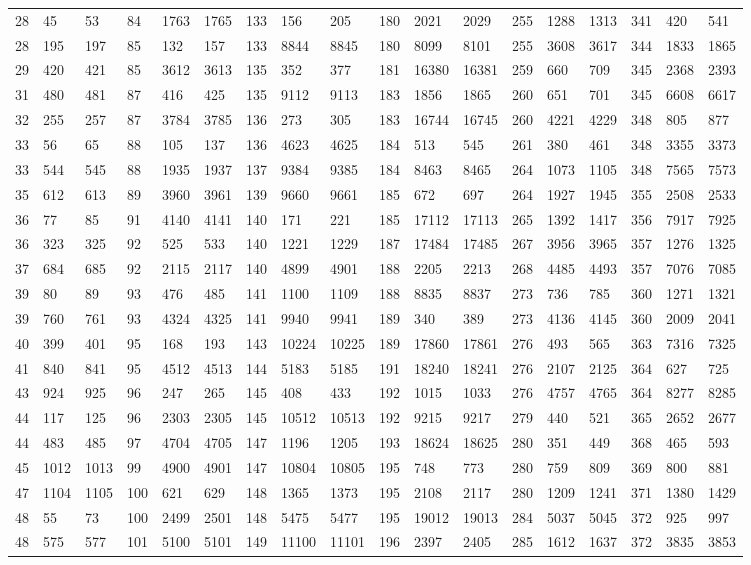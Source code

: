 \begin{center}
\begin{longtable}{*5{A@{\hspace*{5mm}}A}}
28&45&53&84&1763&1765&133&156&205&180&2021&2029&255&1288&1313&341&420&541\\
28&195&197&85&132&157&133&8844&8845&180&8099&8101&255&3608&3617&344&1833&1865\\
29&420&421&85&3612&3613&135&352&377&181&16380&16381&259&660&709&345&2368&2393\\
31&480&481&87&416&425&135&9112&9113&183&1856&1865&260&651&701&345&6608&6617\\
32&255&257&87&3784&3785&136&273&305&183&16744&16745&260&4221&4229&348&805&877\\
33&56&65&88&105&137&136&4623&4625&184&513&545&261&380&461&348&3355&3373\\
33&544&545&88&1935&1937&137&9384&9385&184&8463&8465&264&1073&1105&348&7565&7573\\
35&612&613&89&3960&3961&139&9660&9661&185&672&697&264&1927&1945&355&2508&2533\\
36&77&85&91&4140&4141&140&171&221&185&17112&17113&265&1392&1417&356&7917&7925\\
36&323&325&92&525&533&140&1221&1229&187&17484&17485&267&3956&3965&357&1276&1325\\
37&684&685&92&2115&2117&140&4899&4901&188&2205&2213&268&4485&4493&357&7076&7085\\
39&80&89&93&476&485&141&1100&1109&188&8835&8837&273&736&785&360&1271&1321\\
39&760&761&93&4324&4325&141&9940&9941&189&340&389&273&4136&4145&360&2009&2041\\
40&399&401&95&168&193&143&10224&10225&189&17860&17861&276&493&565&363&7316&7325\\
41&840&841&95&4512&4513&144&5183&5185&191&18240&18241&276&2107&2125&364&627&725\\
43&924&925&96&247&265&145&408&433&192&1015&1033&276&4757&4765&364&8277&8285\\
44&117&125&96&2303&2305&145&10512&10513&192&9215&9217&279&440&521&365&2652&2677\\
44&483&485&97&4704&4705&147&1196&1205&193&18624&18625&280&351&449&368&465&593\\
45&1012&1013&99&4900&4901&147&10804&10805&195&748&773&280&759&809&369&800&881\\
47&1104&1105&100&621&629&148&1365&1373&195&2108&2117&280&1209&1241&371&1380&1429\\
48&55&73&100&2499&2501&148&5475&5477&195&19012&19013&284&5037&5045&372&925&997\\
48&575&577&101&5100&5101&149&11100&11101&196&2397&2405&285&1612&1637&372&3835&3853\\

\end{longtable}
\end{center}
